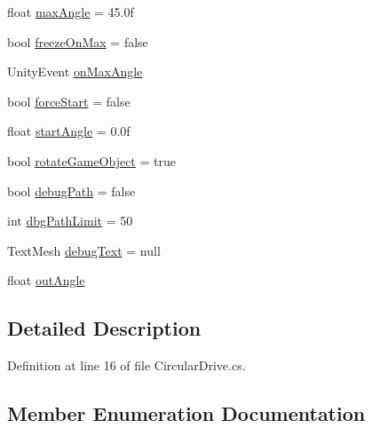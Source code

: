 \begin{DoxyCompactItemize}
\item 
float \mbox{\hyperlink{class_valve_1_1_v_r_1_1_interaction_system_1_1_circular_drive_a6dd5a1ce6896c643324ef89b890557d2}{max\+Angle}} = 45.\+0f
\item 
bool \mbox{\hyperlink{class_valve_1_1_v_r_1_1_interaction_system_1_1_circular_drive_ad8f3727a1120306fa69e3d6d56055aa9}{freeze\+On\+Max}} = false
\item 
Unity\+Event \mbox{\hyperlink{class_valve_1_1_v_r_1_1_interaction_system_1_1_circular_drive_a4b44323fd2fc1d9f21aa3adfb631697b}{on\+Max\+Angle}}
\item 
bool \mbox{\hyperlink{class_valve_1_1_v_r_1_1_interaction_system_1_1_circular_drive_a0f4cfceb109259e41800cce25dce0c3f}{force\+Start}} = false
\item 
float \mbox{\hyperlink{class_valve_1_1_v_r_1_1_interaction_system_1_1_circular_drive_aeb873828f646a744d57bd77b8ef7b1bd}{start\+Angle}} = 0.\+0f
\item 
bool \mbox{\hyperlink{class_valve_1_1_v_r_1_1_interaction_system_1_1_circular_drive_a35df98d8e3d550859610175298fe32e6}{rotate\+Game\+Object}} = true
\item 
bool \mbox{\hyperlink{class_valve_1_1_v_r_1_1_interaction_system_1_1_circular_drive_a155bba9d6c9819bce12a66f739c3e3a7}{debug\+Path}} = false
\item 
int \mbox{\hyperlink{class_valve_1_1_v_r_1_1_interaction_system_1_1_circular_drive_a4c793fa3de71c7d7063b70c8566516ec}{dbg\+Path\+Limit}} = 50
\item 
Text\+Mesh \mbox{\hyperlink{class_valve_1_1_v_r_1_1_interaction_system_1_1_circular_drive_a918ce2445696801ab1e723fbf39522e3}{debug\+Text}} = null
\item 
float \mbox{\hyperlink{class_valve_1_1_v_r_1_1_interaction_system_1_1_circular_drive_ae22ed245544a713344e01eafaf91122c}{out\+Angle}}
\end{DoxyCompactItemize}


\subsection{Detailed Description}


Definition at line 16 of file Circular\+Drive.\+cs.



\subsection{Member Enumeration Documentation}
\mbox{\label{class_valve_1_1_v_r_1_1_interaction_system_1_1_circular_drive_a9a0227d59ad0af7a3422fcab9798b5dd}} 
